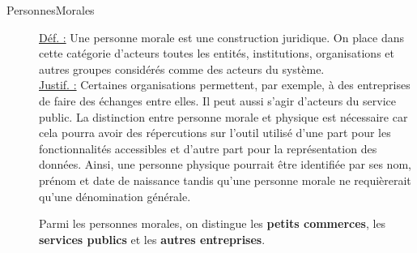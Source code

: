 \begin{description}
\item [PersonnesMorales]
\underline{Déf. :}  Une personne morale est une construction juridique.  On place dans cette catégorie d'acteurs toutes les entités,  institutions,  organisations et autres groupes considérés comme des acteurs du système.  
\\ \underline{Justif. :}  Certaines organisations permettent,  par exemple,  à des entreprises de faire des échanges entre elles.  Il peut aussi s'agir d'acteurs du service public.  La distinction entre personne morale et physique est nécessaire car cela pourra avoir des répercutions sur l'outil utilisé d'une part pour les fonctionnalités accessibles et d'autre part pour la représentation des données.  Ainsi,  une personne physique pourrait être identifiée par ses nom,  prénom et date de naissance tandis qu'une personne morale ne requièrerait qu'une dénomination générale. 
\newline

Parmi les personnes morales,  on distingue les \textbf{petits commerces},  les \textbf{services publics} et les \textbf{autres entreprises}.

%
%


\end{description}

